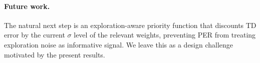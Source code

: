 \documentclass{article}
\begin{document}
\paragraph{Future work.}
The natural next step is an exploration-aware priority function that discounts
TD error by the current $\sigma$ level of the relevant weights, preventing PER
from treating exploration noise as informative signal.
We leave this as a design challenge motivated by the present results.




\end{document}
